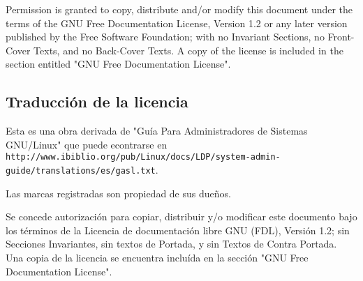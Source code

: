 \documentclass[12pt]{article}
\begin{document}
Permission is granted to copy, distribute and/or modify this document under
the terms of the GNU Free Documentation License, Version 1.2 or any later
version published by the Free Software Foundation; with no Invariant
Sections, no Front-Cover Texts, and no Back-Cover Texts. A copy of the
license is included in the section entitled "GNU Free Documentation License".

\subsection{Traducción de la licencia}
Esta es una obra derivada de "Guía Para Administradores de Sistemas GNU/Linux" que puede 
econtrarse en \\ \texttt{http://www.ibiblio.org/pub/Linux/docs/LDP/system-admin-guide/translations/es/gasl.txt}.

Las marcas registradas son propiedad de sus dueños.

Se concede autorización para copiar, distribuir y/o modificar este documento
bajo los términos de la Licencia de documentación libre GNU (FDL), Versión 1.2; 
sin Secciones Invariantes, sin textos de Portada, y sin Textos de Contra Portada. 
Una copia de la licencia se encuentra incluída en la sección "GNU Free Documentation License".
\end{document}
